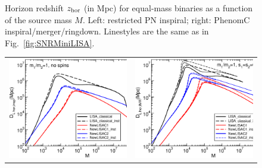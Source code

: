 \documentclass{iopart}
\begin{document}
\begin{figure}[H]
\begin{center}
\begin{tabular}{cc}
\end{tabular}
\caption{\label{fig:zMiniLISA} Horizon redshift $z_{\rm hor}$ (in Mpc) for
  equal-mass binaries as a function of the source mass $M$. Left: restricted
  PN inspiral; right: {\sc PhenomC} inspiral/merger/ringdown. Linestyles are
  the same as in Fig.~\ref{fig:SNRMiniLISA}.}
\end{center}
\end{figure}
%

%
\begin{figure}[H]
\begin{center}
\begin{tabular}{cc}
\includegraphics[scale=0.33,clip=true]{FigEmanuele/DLNewLISAinsp.eps}&
\includegraphics[scale=0.33,clip=true]{FigEmanuele/DLNewLISAIMR.eps}\\

\end{tabular}
\end{center}
\end{figure}
\end{document}
